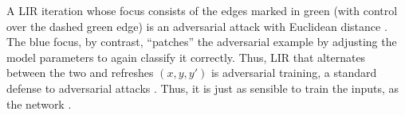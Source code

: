 \documentclass{article} %
\theoremstyle{plain}
\theoremstyle{definition}
\theoremstyle{remark}
\let\cite\citep
\newcommand{\mehran}[1]{\todo[backgroundcolor=blue!20]{\textbf{Mehran:} #1}}
\newcommand{\oliver}[1]{\todo[backgroundcolor=green!20]{\textbf{Oliver:} #1}}
\begin{document}
A LIR iteration whose focus consists of the edges marked in green (with control over the dashed green edge)
   is an adversarial attack with Euclidean distance \cite{biggio2013advattk}.
The blue focus, by contrast, ``patches'' the adversarial example by
   adjusting the model parameters to again classify it correctly.
Thus, LIR that alternates between the two and refreshes $(x,y,y')$ is adversarial training, a standard defense to adversarial attacks \cite{goodfellow2014explaining}.
%
Thus, it is just as sensible to train the inputs, as the network \cite{FNNS}.

\end{document}
